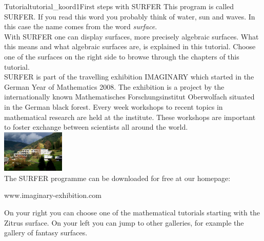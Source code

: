 \begin{surferIntroPage}{Tutorial}{tutorial_koord1}{First steps with SURFER}
This program is called SURFER. If you read this word you probably think of water, sun and waves. In this case the name comes from the word {\it surface}.
\\
With SURFER one can display surfaces, more precisely algebraic surfaces. What this means and what algebraic surfaces are, is explained in this tutorial. Choose one of the surfaces on the right side to browse through the chapters of this tutorial.\\
SURFER is part of the travelling exhibition IMAGINARY which started in the German Year of Mathematics 2008. The exhibition is a project by the internationally known Mathematisches Forschungsinstitut Oberwolfach situated in the German black forest. Every week workshops to recent topics in mathematical research are held at the institute. These workshops are important to foster exchange between scientists all around the world. \\
\vspace{0.2cm} \hspace{3.5cm}\includegraphics[width=3cm]{./../../common/images/photo_mfo.jpg}\\
The SURFER programme can be downloaded for free at our homepage: \\
\begin{centering}
www.imaginary-exhibition.com\\
\end{centering}
 \vspace{0.2cm}
On your right you can choose one of the mathematical tutorials starting with the Zitrus surface. On your left you can jump to other galleries, for example the gallery of fantasy surfaces.
\end{surferIntroPage}
